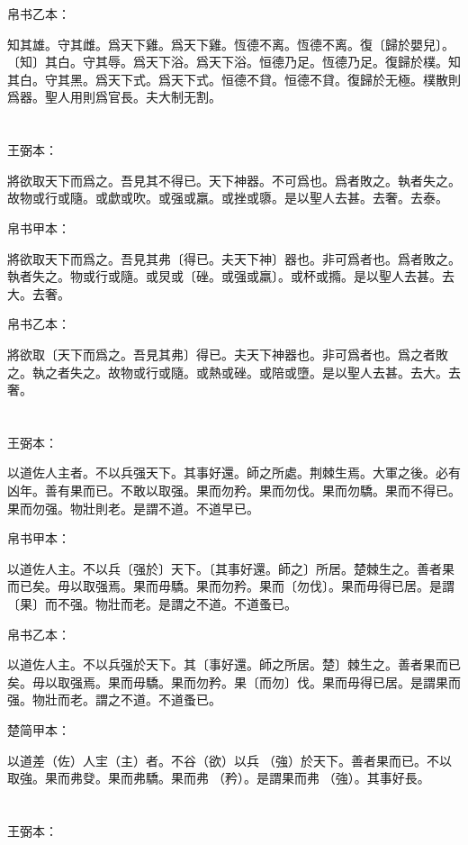 \documentclass[a5paper]{ctexbook}
\begin{document}
    帛书乙本：

    知其雄。守其雌。爲天下雞。爲天下雞。恆德不离。恆德不离。復〔歸於嬰兒〕。〔知〕其白。守其辱。爲天下浴。爲天下浴。恒德乃足。恆德乃足。復歸於樸。知其白。守其黑。爲天下式。爲天下式。恒德不貸。恒德不貸。復歸於无極。樸散則爲器。聖人用則爲官長。夫大制无割。

    \chapter{}
    王弼本：

    將欲取天下而爲之。吾見其不得已。天下神器。不可爲也。爲者敗之。執者失之。故物或行或隨。或歔或吹。或强或羸。或挫或隳。是以聖人去甚。去奢。去泰。

    
    帛书甲本：

    將欲取天下而爲之。吾見其弗〔得已。夫天下神〕器也。非可爲者也。爲者敗之。執者失之。物或行或隨。或炅或〔䂳。或强或羸〕。或杯或撱。是以聖人去甚。去大。去奢。

    帛书乙本：

    將欲取〔天下而爲之。吾見其弗〕得已。夫天下神器也。非可爲者也。爲之者敗之。執之者失之。故物或行或隨。或熱或䂳。或陪或墮。是以聖人去甚。去大。去奢。

    \chapter{}
    王弼本：

    以道佐人主者。不以兵强天下。其事好還。師之所處。荆棘生焉。大軍之後。必有凶年。善有果而已。不敢以取强。果而勿矜。果而勿伐。果而勿驕。果而不得已。果而勿强。物壯則老。是謂不道。不道早已。

    
    帛书甲本：

    以道佐人主。不以兵〔强於〕天下。〔其事好還。師之〕所居。楚棘生之。善者果而已矣。毋以取强焉。果而毋驕。果而勿矜。果而〔勿伐〕。果而毋得已居。是謂〔果〕而不强。物壯而老。是謂之不道。不道蚤已。

    帛书乙本：

    以道佐人主。不以兵强於天下。其〔事好還。師之所居。楚〕棘生之。善者果而已矣。毋以取强焉。果而毋驕。果而勿矜。果〔而勿〕伐。果而毋得已居。是謂果而强。物壯而老。謂之不道。不道蚤已。

    楚简甲本：

    以道差（佐）人宔（主）者。不谷（欲）以兵󶴘（強）於天下。善者果而已。不以取強。果而弗癹。果而弗驕。果而弗󶴙（矜）。是謂果而弗󶴘（強）。其事好長。

    \chapter{}
    王弼本：
\end{document}
